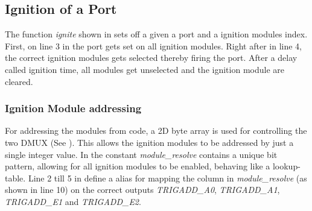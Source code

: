 
\pagebreak

\subsection{Ignition of a Port}




\noindent The function \textit{ignite} shown in  sets off a given a port and a ignition modules index. First, on line 3 in  the port gets set on all ignition modules. Right after in line 4, the correct ignition modules gets selected thereby firing the port. After a delay called ignition time, all modules get unselected and the ignition module are cleared.\\

\subsubsection{Ignition Module addressing}
\label{Ignition Module addressing}



\noindent For addressing the modules from code, a 2D byte array is used for controlling the two DMUX (See ). This allows the ignition modules to be addressed by just a single integer value.  In  the constant \textit{module\_resolve} contains a unique bit pattern, allowing for all ignition modules to be enabled, behaving like a lookup-table. Line 2 till 5 in  define a alias for mapping the column in \textit{module\_resolve} (as shown in line 10) on the correct outputs \textit{TRIGADD\_A0}, \textit{TRIGADD\_A1}, \textit{TRIGADD\_E1}  and \textit{TRIGADD\_E2}. 



